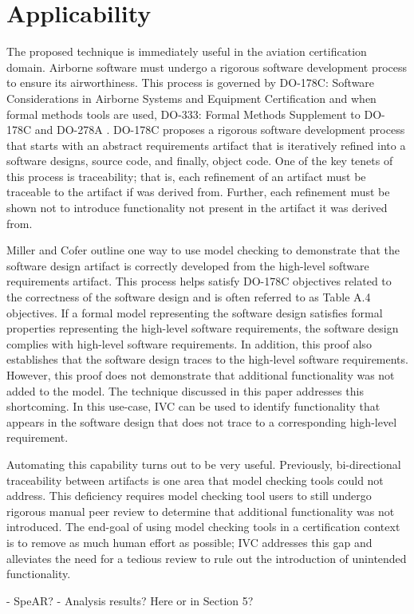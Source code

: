 \section{Applicability}
\label{sec:applicability}

The proposed technique is immediately useful in the aviation certification domain. Airborne software must undergo a rigorous software development process to ensure its airworthiness. This process is governed by DO-178C: Software Considerations in Airborne Systems and Equipment Certification \cite{} and when formal methods tools are used, DO-333: Formal Methods Supplement to DO-178C and DO-278A \cite{}. DO-178C proposes a rigorous software development process that starts with an abstract requirements artifact that is iteratively refined into a software designs, source code, and finally, object code. One of the key tenets of this process is traceability; that is, each refinement of an artifact must be traceable to the artifact if was derived from. Further, each refinement must be shown not to introduce functionality not present in the artifact it was derived from.

Miller and Cofer \cite{} outline one way to use model checking to demonstrate that the software design artifact is correctly developed from the high-level software requirements artifact. This process helps satisfy DO-178C objectives related to the correctness of the software design and is often referred to as Table A.4 objectives. If a formal model representing the software design satisfies formal properties representing the high-level software requirements, the software design complies with high-level software requirements. In addition, this proof also establishes that the software design traces to the high-level software requirements. However, this proof does not demonstrate that additional functionality was not added to the model. The technique discussed in this paper addresses this shortcoming. In this use-case, IVC can be used to identify functionality that appears in the software design that does not trace to a corresponding high-level requirement.

Automating this capability turns out to be very useful. Previously, bi-directional traceability between artifacts is one area that model checking tools could not address. This deficiency requires model checking tool users to still undergo rigorous manual peer review to determine that additional functionality was not introduced. The end-goal of using model checking tools in a certification context is to remove as much human effort as possible; IVC addresses this gap and alleviates the need for a tedious review to rule out the introduction of unintended functionality.

- SpeAR? \cite{}
- Analysis results? Here or in Section 5?
